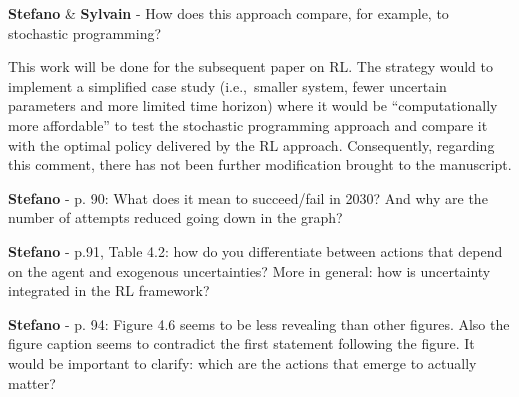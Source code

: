 \documentclass[12pt,a4paper]{article}
\def\ie{i.e.,\ }
\begin{document}
\noindent 

\begin{mdframed}[style=manuscript] %

\end{mdframed}

\begin{mdframed}[style=comment] %
{\color{orange} \textbf{Stefano}} \& {\color{purple} \textbf{Sylvain}} - How does this approach compare, for example, to stochastic programming?
\end{mdframed}

\noindent This work will be done for the subsequent paper on RL. The strategy would to implement a simplified case study (\ie smaller system, fewer uncertain parameters and more limited time horizon) where it would be ``computationally more affordable'' to test the stochastic programming approach and compare it with the optimal policy delivered by the RL approach. Consequently, regarding this comment, there has not been further modification brought to the manuscript.

\begin{mdframed}[style=comment] %
{\color{orange} \textbf{Stefano}} - p. 90: What does it mean to succeed/fail in 2030? And why are the number of attempts reduced going down in the graph?
\end{mdframed}

\noindent 

\begin{mdframed}[style=manuscript] %

\end{mdframed}

\begin{mdframed}[style=comment] %
{\color{orange} \textbf{Stefano}} - p.91, Table 4.2: how do you differentiate between actions that depend on the agent and exogenous uncertainties? More in general: how is uncertainty integrated in the RL framework?
\end{mdframed}

\noindent 

\begin{mdframed}[style=manuscript] %

\end{mdframed}

\begin{mdframed}[style=comment] %
{\color{orange} \textbf{Stefano}} - p. 94: Figure 4.6 seems to be less revealing than other figures. Also the figure caption seems to contradict the first statement following the figure. It would be important to clarify: which are the actions that emerge to actually matter?
\end{mdframed}
\end{document}
